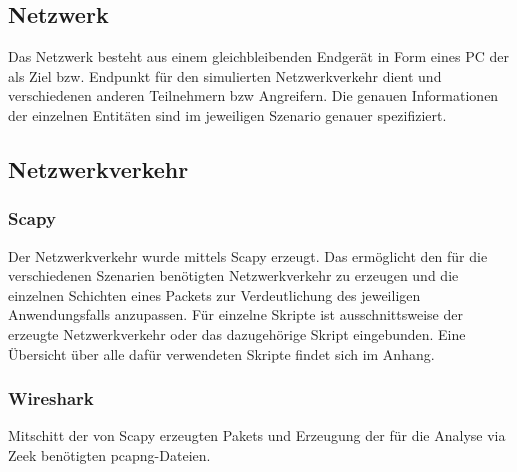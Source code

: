 \subsection{Netzwerk}
Das Netzwerk besteht aus einem gleichbleibenden Endgerät in Form eines PC der als Ziel bzw. Endpunkt für den simulierten Netzwerkverkehr dient und verschiedenen anderen Teilnehmern bzw Angreifern. Die genauen Informationen der einzelnen Entitäten sind im jeweiligen Szenario genauer spezifiziert.
\subsection{Netzwerkverkehr}
\subsubsection{Scapy}
Der Netzwerkverkehr wurde mittels Scapy erzeugt. Das ermöglicht den für die verschiedenen Szenarien benötigten Netzwerkverkehr zu erzeugen und die einzelnen Schichten eines Packets zur Verdeutlichung des jeweiligen Anwendungsfalls anzupassen. Für einzelne Skripte ist ausschnittsweise der erzeugte Netzwerkverkehr oder das dazugehörige Skript eingebunden. Eine Übersicht über alle dafür verwendeten Skripte findet sich im Anhang.
\subsubsection{Wireshark}
Mitschitt der von Scapy erzeugten Pakets und Erzeugung der für die Analyse via Zeek benötigten pcapng-Dateien.
